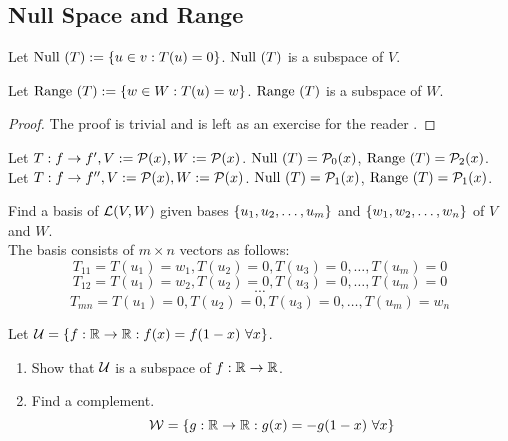 \subsection{Null Space and Range}
\begin{theorem}
    Let $\text{Null } (T):= \left\{ u \in  v : T(u) = 0 \right\}$. $\text{Null } (T)$ is a subspace of $V$.
\end{theorem}
\begin{theorem}
    Let $\text{Range } (T):= \left\{ w \in W : T(u) = w \right\}$. $\text{Range }(T)$ is a subspace of $W$.
\end{theorem}
\begin{proof}
    The proof is trivial and is left as an exercise for the reader .
\end{proof}
\begin{example}
    Let $T: f \to f', V:= \mathcal P(x), W:= \mathcal P(x)$. $\text{Null }(T) = \mathcal P_0(x)$, $\text{Range }(T) = \mathcal P_2(x)$. \\
    Let $T: f \to f'', V:= \mathcal P(x), W:= \mathcal P(x)$. $\text{Null }(T) = \mathcal P_1(x)$, $\text{Range }(T) = \mathcal P_1(x)$.
\end{example}
\begin{example}
    Find a basis of $\mathcal L (V,W)$ given bases $\left\{ {u}_1,{u}_2, \ldots, {u}_{m} \right\}$ and $\left\{ {w}_1,{w}_2, \ldots, {w}_{n} \right\}$ of $V$ and $W$. \\
    The basis consists of $m \times n$ vectors as follows: 
    \[T_{11} = T(u_1) = w_1, T(u_2) = 0, T(u_3) = 0, \ldots ,T(u_m) = 0\]
    \[T_{12} = T(u_1) = w_2, T(u_2) = 0, T(u_3) = 0, \ldots ,T(u_m) = 0\]
    \[ \cdots \]
    \[T_{mn} = T(u_1) = 0, T(u_2) = 0, T(u_3) = 0, \ldots ,T(u_m) = w_n\]
\end{example}
\begin{example}
    Let $\mathcal U = \left\{ f : \mathbb R \to \mathbb R : f(x) = f(1-x) \ \forall x \right\}$.
    \begin{enumerate}
        \item Show that $\mathcal U$ is a subspace of $f: \mathbb R \to \mathbb R$. 
        
        \item Find a complement.
        \[ \mathcal W  = \left\{ g : \mathbb R \to \mathbb R : g(x) = -g(1 - x) \ \forall x \right\}\]
        
    \end{enumerate}
\end{example}
